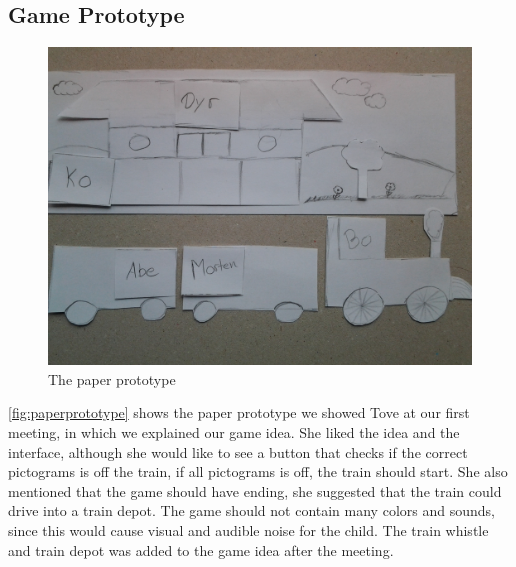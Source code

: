 \subsection{Game Prototype}
\begin{figure}[H]
\centering
\includegraphics[width=0.9\linewidth]{img/screenshots/prototype1.jpg}%
\caption{The paper prototype}
\label{fig:paperprototype}
\end{figure}
\autoref{fig:paperprototype} shows the paper prototype we showed Tove at our first meeting, in which we explained our game idea. She liked the idea and the interface, although she would like to see a button that checks if the correct pictograms is off the train, if all pictograms is off, the train should start. She also mentioned that the game should have ending, she suggested that the train could drive into a train depot. The game should not contain many colors and sounds, since this would cause visual and audible noise for the child. The train whistle and train depot was added to the game idea after the meeting.

